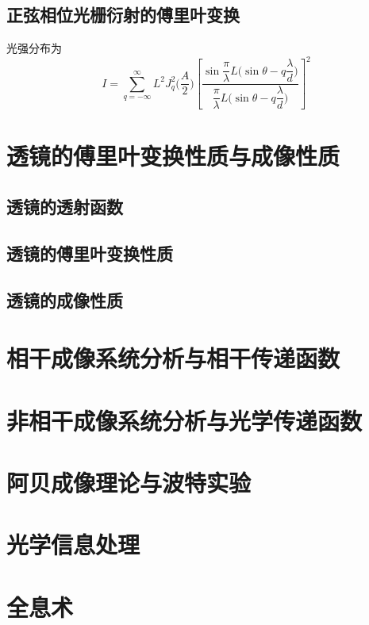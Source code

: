 \documentclass[cn,10pt,chinesefont=founder,math=mtpro2,cite=super,toc=onecol,twoside,openany]{elegantbook}
\begin{document}
\subsection{正弦相位光栅衍射的傅里叶变换}

光强分布为
\begin{equation}
I=\sum_{q=-\infty}^{\infty}L^2J_q^2\bigg(\frac{A}{2}\bigg)\left[\frac{\sin\dfrac{\pi}{\lambda}L\bigg(\sin\theta-q\dfrac{\lambda}{d}\bigg)}{\dfrac{\pi}{\lambda}L\bigg(\sin\theta-q\dfrac{\lambda}{d}\bigg)}\right]^2
\end{equation}

\section{透镜的傅里叶变换性质与成像性质}
\subsection{透镜的透射函数}

\subsection{透镜的傅里叶变换性质}

\subsection{透镜的成像性质}

\section{相干成像系统分析与相干传递函数}

\section{非相干成像系统分析与光学传递函数}

\section{阿贝成像理论与波特实验}

\section{光学信息处理}

\section{全息术}
\end{document}
